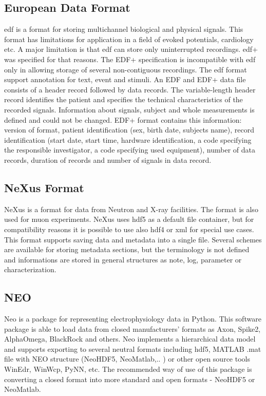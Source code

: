 \subsection{European Data Format}
\gls{edf} is a format for storing multichannel biological and physical signals. This format has limitations for application in a field of evoked potentials, cardiology etc. A major limitation is that \gls{edf} can store only uninterrupted recordings. \gls{edf}+ was specified for that reasons. The EDF+ specification is incompatible with \gls{edf} only in allowing storage of several non-contiguous recordings. The \gls{edf} format support annotation for text, event and stimuli. An EDF and EDF+ data file consists of a header record followed by data records. The variable-length header record identifies the patient and specifies the technical characteristics of the recorded signals. \cite{edf} Information about signals, subject and whole measurements is defined and could not be changed. EDF+ format contains this information: version of format, patient identification (sex, birth date, subjects name), record identification (start date, start time, hardware identification, a code specifying the responsible investigator, a code specifying used equipment), number of data records, duration of records and number of signals in data record.


\subsection{NeXus Format}
\label{nexus_format}
NeXus is a format for data from Neutron and X-ray facilities. The format is also used for muon experiments. NeXus uses \gls{hdf5} as a default file container, but for compatibility reasons it is possible to use also \gls{hdf4} or \gls{xml} for special use cases. This format supports saving data and metadata into a single file. Several schemes are available for storing metadata sections, but the terminology is not defined and informations are stored in general structures as note, log, parameter or characterization. \cite{nexus}

\subsection{NEO}
Neo is a package for representing electrophysiology data in Python. This software package is able to load data from closed manufacturers' formats as Axon, Spike2, AlphaOmega, BlackRock and others. Neo implements a hierarchical data model and supports exporting to several neutral formats including \gls{hdf5}, MATLAB .mat file with NEO structure (NeoHDF5, NeoMatlab,.. ) or other open source tools WinEdr, WinWcp, PyNN, etc. The recommended way of use of this package is converting a closed format into more standard and open formats - NeoHDF5 or NeoMatlab. 



